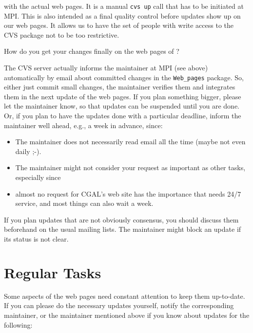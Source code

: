 with the actual web pages. It is a manual \texttt{cvs up} call that
has to be initiated at MPI. This is also intended as a final quality
control before updates show up on our web pages. It allows us to have
the set of people with write access to the CVS package not to be too
restrictive.

How do you get your changes finally on the web pages of \cgal?

The CVS server actually informs the maintainer at MPI (see above)
automatically by email about committed changes in the
\texttt{Web\_pages} package. So, either just commit small changes, the
maintainer verifies them and integrates them in the next update of the
web pages. If you plan something bigger, please let the maintainer
know, so that updates can be suspended until you are done.  Or, if you
plan to have the updates done with a particular deadline, inform the
maintainer well ahead, e.g., a week in advance, since:

\begin{itemize}
    \item 
        The maintainer does not necessarily read email all the time
        (maybe not even daily ;-).
    \item
        The maintainer might not consider your request as important as
        other tasks, especially since 
    \item
        almost no request for CGAL's web site has the importance that needs
        24/7 service, and most things can also wait a week.
\end{itemize}

If you plan updates that are not obviously consensus, you should discuss them
beforehand on the usual mailing lists. The maintainer might block an
update if its status is not clear.


\section{Regular Tasks}

Some aspects of the web pages need constant attention to keep them
up-to-date. If you can please do the necessary updates yourself,
notify the corresponding maintainer, or the maintainer mentioned above
if you know about updates for the following:

